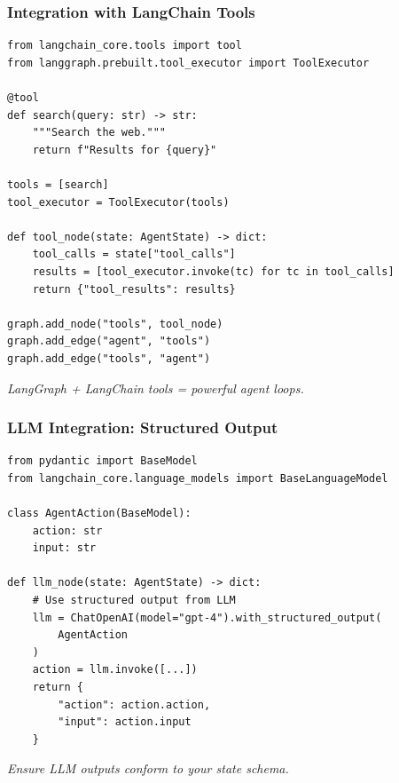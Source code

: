 \documentclass[aspectratio=169,11pt]{beamer}
\begin{document}
\begin{frame}[fragile]
\frametitle{Integration with LangChain Tools}
\begin{lstlisting}
from langchain_core.tools import tool
from langgraph.prebuilt.tool_executor import ToolExecutor

@tool
def search(query: str) -> str:
    """Search the web."""
    return f"Results for {query}"

tools = [search]
tool_executor = ToolExecutor(tools)

def tool_node(state: AgentState) -> dict:
    tool_calls = state["tool_calls"]
    results = [tool_executor.invoke(tc) for tc in tool_calls]
    return {"tool_results": results}

graph.add_node("tools", tool_node)
graph.add_edge("agent", "tools")
graph.add_edge("tools", "agent")
\end{lstlisting}

\textit{LangGraph + LangChain tools = powerful agent loops.}
\end{frame}

\begin{frame}[fragile]
\frametitle{LLM Integration: Structured Output}
\begin{lstlisting}
from pydantic import BaseModel
from langchain_core.language_models import BaseLanguageModel

class AgentAction(BaseModel):
    action: str
    input: str

def llm_node(state: AgentState) -> dict:
    # Use structured output from LLM
    llm = ChatOpenAI(model="gpt-4").with_structured_output(
        AgentAction
    )
    action = llm.invoke([...])
    return {
        "action": action.action,
        "input": action.input
    }
\end{lstlisting}

\vspace{10pt}
\textit{Ensure LLM outputs conform to your state schema.}
\end{frame}
\end{document}
